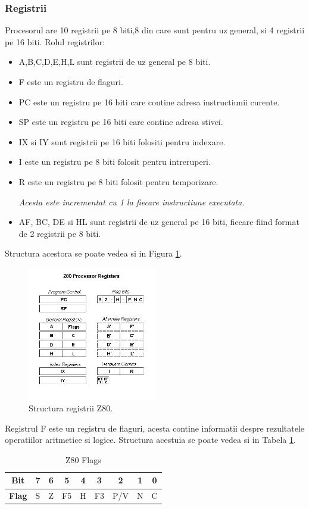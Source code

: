 \documentclass[titlepage]{article}
\begin{document}
\subsubsection{Registrii}
Procesorul are 10 registrii pe 8 biti,8 din care sunt pentru uz general, si 4 registrii pe 16 biti.
Rolul registrilor:
\begin{itemize}
    \item A,B,C,D,E,H,L sunt registrii de uz general pe 8 biti.
    \item F este un registru de flaguri.
    \item PC este un registru pe 16 biti care contine adresa instructiunii curente.
    \item SP este un registru pe 16 biti care contine adresa stivei.
    \item IX si IY sunt registrii pe 16 biti folositi pentru indexare.
    \item I este un registru pe 8 biti folosit pentru intreruperi.
    \item R este un registru pe 8 biti folosit pentru temporizare.
    \par \hspace{1em} \textit{Acesta este incrementat cu 1 la fiecare instructiune executata.}
    \item AF, BC, DE si HL sunt registrii de uz general pe 16 biti, fiecare fiind format de 2 registrii pe 8 biti.
\end{itemize}
Structura acestora se poate vedea si in Figura \ref{fig:z80registers}.
\begin{figure}[H]
    \centering
    \includegraphics[width=0.5\textwidth]{images/z80registers.jpg}
    \caption{Structura registrii Z80. \cite{ref:z80registers}}
    \label{fig:z80registers}
\end{figure}

Registrul F este un registru de flaguri, acesta contine informatii despre rezultatele operatiilor aritmetice si logice.
Structura acestuia se poate vedea si in Tabela \ref{tab:z80flags}.
\begin{table}[h]
    \centering
    \begin{tabular}{|c|c|c|c|c|c|c|c|c|}
    \hline
    \textbf{Bit} & 7 & 6 & 5 & 4 & 3 & 2 & 1 & 0 \\
    \hline
    \textbf{Flag} & S & Z & F5 & H & F3 & P/V & N & C \\
    \hline
    \end{tabular}
    \caption{Z80 Flags}
    \label{tab:z80flags}
\end{table}
\end{document}
